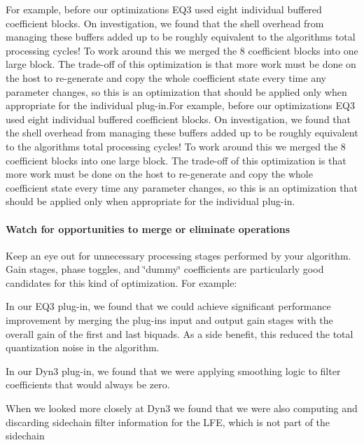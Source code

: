 For example, before our optimizations E\+Q3 used eight individual buffered coefficient blocks. On investigation, we found that the shell overhead from managing these buffers added up to be roughly equivalent to the algorithm\textquotesingle{}s total processing cycles! To work around this we merged the 8 coefficient blocks into one large block. The trade-\/off of this optimization is that more work must be done on the host to re-\/generate and copy the whole coefficient state every time any parameter changes, so this is an optimization that should be applied only when appropriate for the individual plug-\/in.\+For example, before our optimizations E\+Q3 used eight individual buffered coefficient blocks. On investigation, we found that the shell overhead from managing these buffers added up to be roughly equivalent to the algorithm\textquotesingle{}s total processing cycles! To work around this we merged the 8 coefficient blocks into one large block. The trade-\/off of this optimization is that more work must be done on the host to re-\/generate and copy the whole coefficient state every time any parameter changes, so this is an optimization that should be applied only when appropriate for the individual plug-\/in.

\hypertarget{a00832_subsubsection__watch_for_opportunities_to_merge_or_eliminate_operations_}{}\paragraph{Watch for opportunities to merge or eliminate operations}\label{a00832_subsubsection__watch_for_opportunities_to_merge_or_eliminate_operations_}
 Keep an eye out for unnecessary processing stages performed by your algorithm. Gain stages, phase toggles, and \char`\"{}dummy\char`\"{} coefficients are particularly good candidates for this kind of optimization. For example\+:


\begin{DoxyItemize}
\item In our E\+Q3 plug-\/in, we found that we could achieve significant performance improvement by merging the plug-\/in\textquotesingle{}s input and output gain stages with the overall gain of the first and last biquads. As a side benefit, this reduced the total quantization noise in the algorithm.  
\item In our Dyn3 plug-\/in, we found that we were applying smoothing logic to filter coefficients that would always be zero.  
\item When we looked more closely at Dyn3 we found that we were also computing and discarding sidechain filter information for the L\+FE, which is not part of the sidechain  
\end{DoxyItemize}

